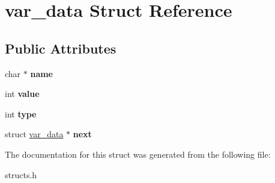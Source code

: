 \hypertarget{structvar__data}{\section{var\-\_\-data Struct Reference}
\label{structvar__data}
}
\subsection*{Public Attributes}
\begin{DoxyCompactItemize}
\item 
\hypertarget{structvar__data_a7a7b19b896fa8d73a4e51eceebd8126a}{char $\ast$ {\bfseries name}}\label{structvar__data_a7a7b19b896fa8d73a4e51eceebd8126a}

\item 
\hypertarget{structvar__data_af02c0ccc7bc097742a52e6c0f9d602c3}{int {\bfseries value}}\label{structvar__data_af02c0ccc7bc097742a52e6c0f9d602c3}

\item 
\hypertarget{structvar__data_a77da3718b382ccb4f1e2460628b0d197}{int {\bfseries type}}\label{structvar__data_a77da3718b382ccb4f1e2460628b0d197}

\item 
\hypertarget{structvar__data_a7f176b0bf237dc2dc8d6220c63f6de4c}{struct \hyperlink{structvar__data}{var\-\_\-data} $\ast$ {\bfseries next}}\label{structvar__data_a7f176b0bf237dc2dc8d6220c63f6de4c}

\end{DoxyCompactItemize}


The documentation for this struct was generated from the following file\-:\begin{DoxyCompactItemize}
\item 
structs.\-h\end{DoxyCompactItemize}

